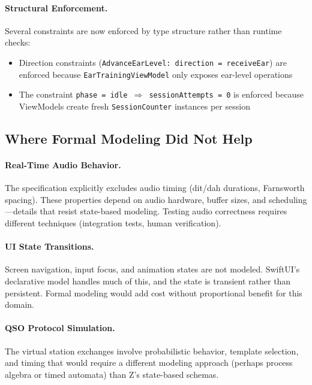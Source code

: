 \documentclass[a4paper,10pt,fleqn]{article}
\begin{document}
\paragraph{Structural Enforcement.}
Several constraints are now enforced by type structure rather than runtime
checks:

\begin{itemize}
\item Direction constraints (\texttt{AdvanceEarLevel: direction = receiveEar})
      are enforced because \texttt{EarTrainingViewModel} only exposes ear-level
      operations
\item The constraint \texttt{phase = idle $\Rightarrow$ sessionAttempts = 0}
      is enforced because ViewModels create fresh \texttt{SessionCounter}
      instances per session
\end{itemize}

\subsection{Where Formal Modeling Did Not Help}

\paragraph{Real-Time Audio Behavior.}
The specification explicitly excludes audio timing (dit/dah durations,
Farnsworth spacing). These properties depend on audio hardware, buffer sizes,
and scheduling---details that resist state-based modeling. Testing audio
correctness requires different techniques (integration tests, human
verification).

\paragraph{UI State Transitions.}
Screen navigation, input focus, and animation states are not modeled.
SwiftUI's declarative model handles much of this, and the state is transient
rather than persistent. Formal modeling would add cost without proportional
benefit for this domain.

\paragraph{QSO Protocol Simulation.}
The virtual station exchanges involve probabilistic behavior, template
selection, and timing that would require a different modeling approach
(perhaps process algebra or timed automata) than Z's state-based schemas.
\end{document}

